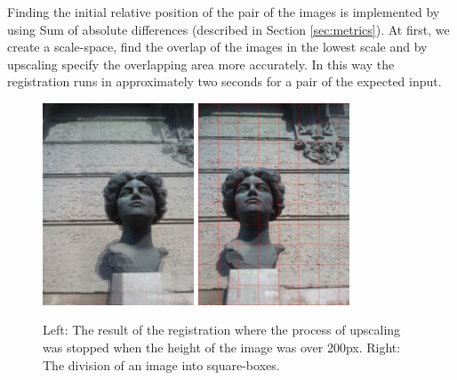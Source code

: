 Finding the initial relative position of the pair of the images is implemented by using Sum of absolute differences (described in Section \ref{sec:metrics}).
At first, we create a scale-space, find the overlap of the images in the lowest scale and by upscaling specify the overlapping area more accurately.
In this way the registration runs in approximately two seconds for a pair of the expected input.


\begin{figure}[H]
\centerline{
\includegraphics[width=4.5cm]{img/ema_overlap.png}
\includegraphics[width=4.5cm]{img/ema_buckets.png}}
\caption{Left: The result of the registration where the process of upscaling was stopped when the height of the image was over 200px. Right: The division of an image into square-boxes.}
\label{fig:overlap_and_buckets}
\end{figure}

